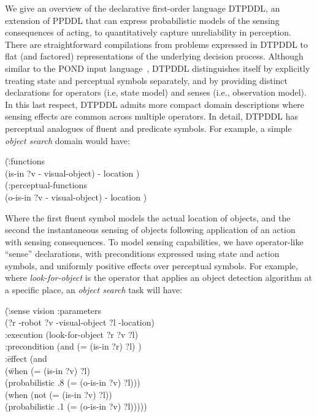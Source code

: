 


We give an overview of the declarative first-order language DTPDDL, an
extension of PPDDL that can express probabilistic models of the
sensing consequences of acting, to quantitatively capture
unreliability in perception. There are straightforward compilations
from problems expressed in DTPDDL to flat (and factored)
representations of the underlying decision process. Although similar
to the POND input language~\cite{Bryce:2008}, DTPDDL distinguishes
itself by explicitly treating state and perceptual symbols separately,
and by providing distinct declarations for operators (i.e, state
model) and senses (i.e., observation model). In this last respect,
DTPDDL admits more compact domain descriptions where sensing effects
are common across multiple operators. In detail, DTPDDL has perceptual
analogues of fluent and predicate symbols. For example, a simple {\em
object search} domain would have:

\vspace{-1ex}
\small
\begin{tabtt}
(\=:functions\\
  \> (is-in ?v - visual-object) - location )\\
(:perceptual-functions\\
  \> (o-is-in ?v - visual-object) - location )
\end{tabtt}
\normalsize
\vspace{-1ex}

\noindent Where the first fluent symbol models the actual location of
objects, and the second the instantaneous sensing of objects
following application of an action with sensing consequences.
To model sensing capabilities, we have operator-like ``sense''
declarations, with preconditions expressed using state and action
symbols, and uniformly positive effects over perceptual symbols. For
example, where {\em look-for-object} is the operator that applies an
object detection algorithm at a specific place, an {\em
object search} task will have:

\vspace{-1ex}
\small
\begin{tabtt}
(\= :sense vision  :parameters \+ \\
  (?r -robot ?v -visual-object ?l -location) \\
 :execution  (look-for-object ?r ?v ?l) \\
 :precondition (and (= (is-in ?r) ?l) ) \\
 :\=effect (and \+\\
    (\= when (= (is-in ?v) ?l)\\
    \>(probabilistic .8 (= (o-is-in ?v) ?l))) \\
   (when (not (= (is-in ?v) ?l)) \\
    \>(probabilistic .1 (= (o-is-in ?v) ?l))))) \\
\end{tabtt}
\normalsize
\vspace{-3ex}

